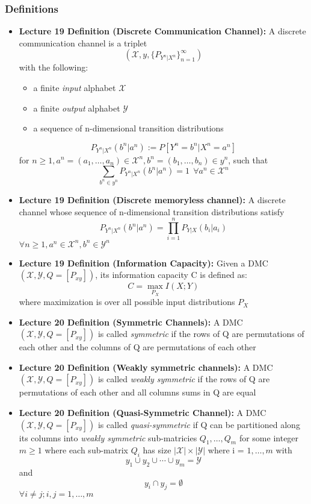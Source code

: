\documentclass{article}
\begin{document}
\subsubsection{Definitions}
\begin{itemize}
    \item \textbf{Lecture 19 Definition (Discrete Communication Channel): } A discrete communication channel is a triplet
    \[(\mathcal{X}, y, \{P_{Y^n|X^n}\}^\infty_{n=1})\]
    with the following:
    \begin{itemize}
        \item a finite \textit{input} alphabet \(\mathcal{X}\)
        \item a finite \textit{output} alphabet \(\mathcal{Y}\)
        \item a sequence of n-dimensional transition distributions
    \end{itemize}
    \[P_{Y^n|X^n}(b^n|a^n) := P[Y^n=b^n|X^n=a^n]\]
    for \(n\geq1, a^n = (a_1, \ldots, a_n)\in \mathcal{X}^n, b^n = (b_1, \ldots, b_n)\in y^n\), such that \[\sum_{b^n \in y^n} P_{Y^n|X^n} (b^n|a^n) = 1  \ \ \forall a^n \in \mathcal{X}^n\]

    \item \textbf{Lecture 19 Definition (Discrete memoryless channel):} A discrete channel whose sequence of n-dimensional transition distributions satisfy
    \[P_{Y^n|X^n}(b^n|a^n) = \prod_{i=1}^n P_{Y|X}(b_i|a_i)\]
    \(\forall n \geq 1, a^n \in \mathcal{X}^n, b^n \in \mathcal{Y}^n\) 

    \item \textbf{ Lecture 19 Definition (Information Capacity): } Given a DMC \((\mathcal{X}, \mathcal{Y}, Q=[P_{xy}])\), its information capacity C is defined as:
    \[C = \max_{P_X} I(X;Y)\]
    where maximization is over all possible input distributions \(P_X\)
    \item \textbf{Lecture 20 Definition (Symmetric Channels): } A DMC \((\mathcal{X}, \mathcal{Y}, Q=[P_{xy}])\) is called \textit{symmetric} if the rows of Q are permutations of each other and the columns of Q are permutations of each other
    \item \textbf{Lecture 20 Definition (Weakly symmetric channels): } A DMC  \((\mathcal{X}, \mathcal{Y}, Q=[P_{xy}])\) is called \textit{weakly symmetric} if the rows of Q are permutations of each other and all columns sums in Q are equal
    \item \textbf{Lecture 20 Definition (Quasi-Symmetric Channel): } A DMC \((\mathcal{X}, \mathcal{Y}, Q=[P_{xy}])\) is called \textit{quasi-symmetric} if Q can be partitioned along its columns into \textit{weakly symmetric} sub-matricies \(Q_1, \ldots, Q_m\) for some integer \(m \geq 1\) where each sub-matrix \(Q_i\) has size \(|\mathcal{X}| \times |\mathcal{Y}|\) where i = \(1, \ldots, m\)
    with 
    \[y_1 \cup y_2 \cup \cdots \cup y_m = \mathcal{Y} \]
    and 
    \[y_i \cap y_j = \emptyset\]
    \(\forall i \neq j; i,j = 1, \ldots, m \)
    
\end{itemize}
\end{document}
